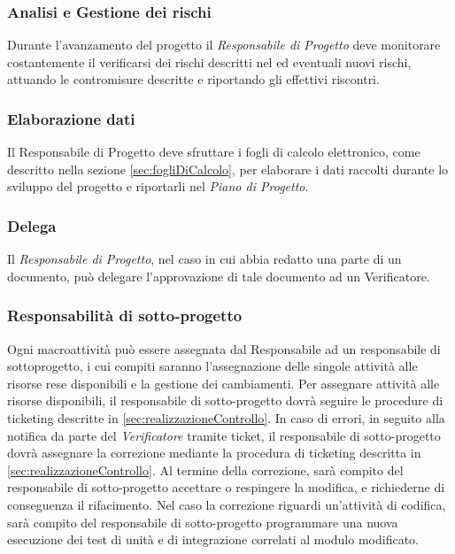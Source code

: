 {\subsubsection{Analisi e Gestione dei rischi}
Durante l’avanzamento del progetto il \emph{Responsabile di Progetto} deve monitorare costantemente il verificarsi dei rischi descritti nel \href{run:../../Esterni/\fPianoDiProgetto}{\fEscapePianoDiProgetto} ed eventuali nuovi rischi, attuando le contromisure descritte e riportando gli effettivi riscontri.

\subsubsection{Elaborazione dati}
Il Responsabile di Progetto deve sfruttare i fogli di calcolo elettronico, come descritto nella sezione \ref{sec:fogliDiCalcolo}, per elaborare i dati raccolti durante lo sviluppo del progetto e riportarli nel \emph{Piano di Progetto}.

\subsubsection{Delega}
\label{sec:delega}
Il \emph{Responsabile di Progetto}, nel caso in cui abbia redatto una parte di un documento, può delegare l'approvazione di tale documento ad un Verificatore.
\subsubsection{Responsabilità di sotto-progetto}
Ogni macroattività può essere assegnata dal Responsabile ad un responsabile di sottoprogetto, i cui compiti saranno l’assegnazione delle singole attività alle risorse rese disponibili e la gestione dei cambiamenti.
Per assegnare attività alle risorse disponibili, il responsabile di sotto-progetto dovrà seguire le procedure di ticketing descritte in \ref{sec:realizzazioneControllo}.
In caso di errori, in seguito alla notifica da parte del \emph{Verificatore} tramite ticket, il responsabile di sotto-progetto dovrà assegnare la correzione mediante la procedura di ticketing descritta in \ref{sec:realizzazioneControllo}. Al termine della correzione, sarà compito del responsabile di sotto-progetto accettare o respingere la modifica, e richiederne di conseguenza il rifacimento.
Nel caso la correzione riguardi un’attività di codifica, sarà compito del responsabile di sotto-progetto programmare una nuova esecuzione dei test di unità e di integrazione correlati al modulo modificato.


}
